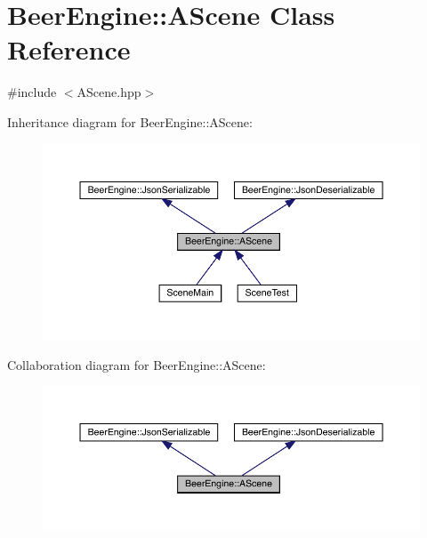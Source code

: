 \hypertarget{class_beer_engine_1_1_a_scene}{}\section{Beer\+Engine\+:\+:A\+Scene Class Reference}
\label{class_beer_engine_1_1_a_scene}


{\ttfamily \#include $<$A\+Scene.\+hpp$>$}



Inheritance diagram for Beer\+Engine\+:\+:A\+Scene\+:
\nopagebreak
\begin{figure}[H]
\begin{center}
\leavevmode
\includegraphics[width=350pt]{class_beer_engine_1_1_a_scene__inherit__graph}
\end{center}
\end{figure}


Collaboration diagram for Beer\+Engine\+:\+:A\+Scene\+:
\nopagebreak
\begin{figure}[H]
\begin{center}
\leavevmode
\includegraphics[width=350pt]{class_beer_engine_1_1_a_scene__coll__graph}
\end{center}
\end{figure}
